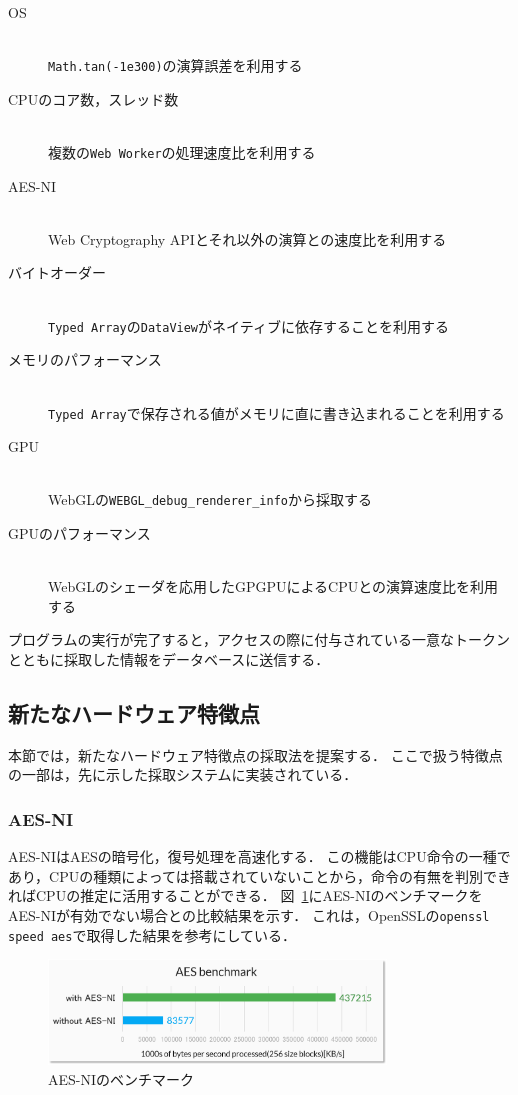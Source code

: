 \begin{description}
	\item[OS]\mbox{}\\
   	\texttt{Math.tan(-1e300)}の演算誤差を利用する\cite{tor_mathtan}
    \item[CPUのコア数，スレッド数]\mbox{}\\
    複数の\texttt{Web Worker}の処理速度比を利用する\cite{後藤浩行2013web,桐生直輝2014web}
    \item[AES-NI]\mbox{}\\
    Web Cryptography APIとそれ以外の演算との速度比を利用する
    \item[バイトオーダー]\mbox{}\\
    \texttt{Typed Array}の\texttt{DataView}がネイティブに依存することを利用する
    \item[メモリのパフォーマンス]\mbox{}\\
    \texttt{Typed Array}で保存される値がメモリに直に書き込まれることを利用する
    \item[GPU]\mbox{}\\
    WebGLの\texttt{WEBGL\_debug\_renderer\_info}から採取する\cite{mowery2012pixel}
    \item[GPUのパフォーマンス]\mbox{}\\
    WebGLのシェーダを応用したGPGPUによるCPUとの演算速度比を利用する
\end{description}

プログラムの実行が完了すると，アクセスの際に付与されている一意なトークンとともに採取した情報をデータベースに送信する．

\subsection{新たなハードウェア特徴点}
本節では，新たなハードウェア特徴点の採取法を提案する．
ここで扱う特徴点の一部は，先に示した採取システムに実装されている．

\subsubsection{AES-NI}
AES-NIはAESの暗号化，復号処理を高速化する．
この機能はCPU命令の一種であり，CPUの種類によっては搭載されていないことから，命令の有無を判別できればCPUの推定に活用することができる．
図~\ref{fig-aes_ni}にAES-NIのベンチマークをAES-NIが有効でない場合との比較結果を示す．
これは，OpenSSLの\texttt{openssl speed aes}で取得した結果を参考にしている．

\begin{figure}[H]
	\centering
    \includegraphics[width=0.8\textwidth,pagebox=artbox]{fig/aes_ni.png}
    \caption{AES-NIのベンチマーク}
    \label{fig-aes_ni}
\end{figure}

